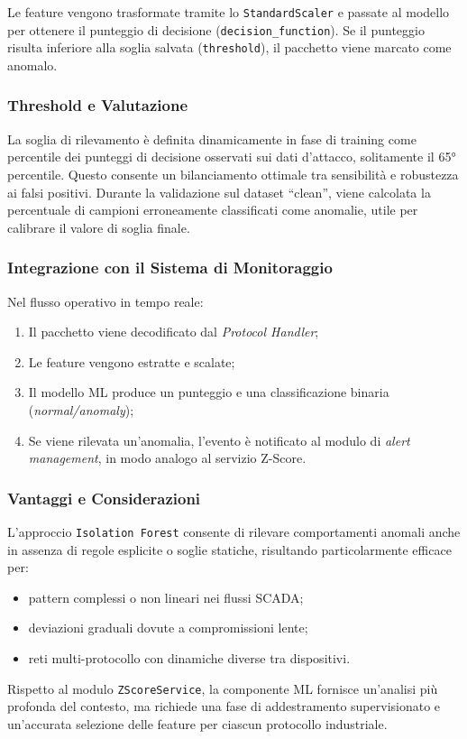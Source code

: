 \begin{enumerate}
Le feature vengono trasformate tramite lo \texttt{StandardScaler} e passate al modello per ottenere il punteggio di decisione (\texttt{decision\_function}).
Se il punteggio risulta inferiore alla soglia salvata (\texttt{threshold}), il pacchetto viene marcato come anomalo.

\subsubsection{Threshold e Valutazione}
La soglia di rilevamento è definita dinamicamente in fase di training come percentile dei punteggi di decisione osservati sui dati d’attacco, solitamente il 65° percentile.
Questo consente un bilanciamento ottimale tra sensibilità e robustezza ai falsi positivi.
Durante la validazione sul dataset “clean”, viene calcolata la percentuale di campioni erroneamente classificati come anomalie, utile per calibrare il valore di soglia finale.

\subsubsection{Integrazione con il Sistema di Monitoraggio}
Nel flusso operativo in tempo reale:
\begin{enumerate}
\item Il pacchetto viene decodificato dal \textit{Protocol Handler};
\item Le feature vengono estratte e scalate;
\item Il modello ML produce un punteggio e una classificazione binaria (\textit{normal/anomaly});
\item Se viene rilevata un’anomalia, l’evento è notificato al modulo di \textit{alert management}, in modo analogo al servizio Z-Score.
\end{enumerate}

\subsubsection{Vantaggi e Considerazioni}
L’approccio \texttt{Isolation Forest} consente di rilevare comportamenti anomali anche in assenza di regole esplicite o soglie statiche, risultando particolarmente efficace per:
\begin{itemize}
\item pattern complessi o non lineari nei flussi SCADA;
\item deviazioni graduali dovute a compromissioni lente;
\item reti multi-protocollo con dinamiche diverse tra dispositivi.
\end{itemize}

Rispetto al modulo \texttt{ZScoreService}, la componente ML fornisce un’analisi più profonda del contesto, ma richiede una fase di addestramento supervisionato e un’accurata selezione delle feature per ciascun protocollo industriale.



\end{enumerate}


